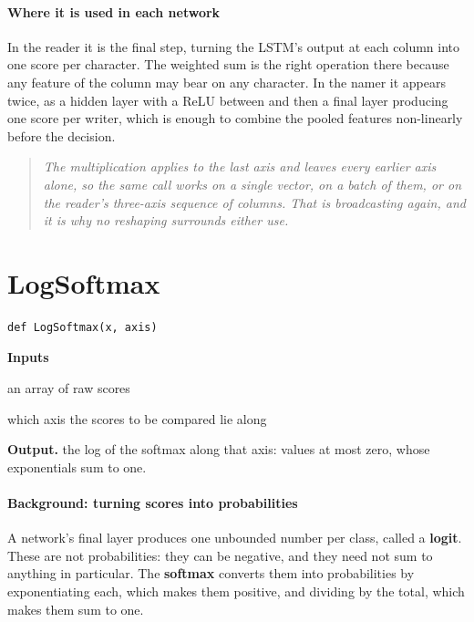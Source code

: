 \paragraph{Where it is used in each network}
In the reader it is the final step, turning the LSTM's output at each column into one score per character. The weighted sum is the right operation there because any feature of the column may bear on any character. In the namer it appears twice, as a hidden layer with a ReLU between and then a final layer producing one score per writer, which is enough to combine the pooled features non-linearly before the decision.


\begin{quote}\small\itshape The multiplication applies to the last axis and leaves every earlier axis alone, so the same call works on a single vector, on a batch of them, or on the reader's three-axis sequence of columns. That is broadcasting again, and it is why no reshaping surrounds either use.\end{quote}

\section{LogSoftmax}
\begin{lstlisting}[style=sig]
def LogSoftmax(x, axis)
\end{lstlisting}

\noindent\textbf{Inputs}
\begin{description}[leftmargin=2.2em,style=nextline,font=\normalfont\ttfamily]\setlength\itemsep{1pt}
  \item[{x}] \normalfont an array of raw scores
  \item[{axis}] \normalfont which axis the scores to be compared lie along
\end{description}

\noindent\textbf{Output.} the log of the softmax along that axis: values at most zero, whose exponentials sum to one.


\paragraph{Background: turning scores into probabilities}
A network's final layer produces one unbounded number per class, called a \textbf{logit}. These are not probabilities: they can be negative, and they need not sum to anything in particular. The \textbf{softmax} converts them into probabilities by exponentiating each, which makes them positive, and dividing by the total, which makes them sum to one.


